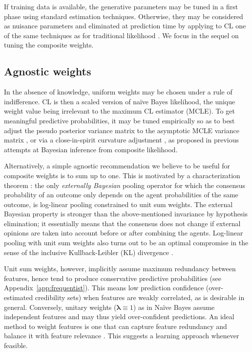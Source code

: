 \documentclass[english]{scrartcl}
\newcommand{\blambda}{{\boldsymbol{\lambda}}}
\begin{document}
If training data is available, the generative parameters may be tuned in a first phase using standard estimation techniques. Otherwise, they may be considered as nuisance parameters and eliminated at prediction time by applying to CL one of the same techniques as for traditional likelihood \cite{Berger-99}. We focus in the sequel on tuning the composite weights.


\subsection{Agnostic weights}

In the absence of knowledge, uniform weights may be chosen under a rule of indifference. CL is then a scaled version of na\"ive Bayes likelihood, the unique weight value being irrelevant to the maximum CL estimator (MCLE). To get meaningful predictive probabilities, it may be tuned empirically so as to best adjust the pseudo posterior variance matrix to the asymptotic MCLE variance matrix \cite{Pauli-11}, or via a close-in-spirit curvature adjustment \cite{Ribatet-12}, as proposed in previous attempts at Bayesian inference from composite likelihood. 

Alternatively, a simple agnostic recommendation we believe to be useful for composite weights is to sum up to one. This is motivated by a characterization theorem \cite{Genest-86,Genest-86b}: the only {\em externally Bayesian} pooling operator for which the consensus probability of an outcome only depends on the agent probabilities of the same outcome, is log-linear pooling constrained to unit sum weights. The external Bayesian property is stronger than the above-mentioned invariance by hypothesis elimination; it essentially means that the consensus does not change if external opinions are taken into account before or after combining the agents. Log-linear pooling with unit sum weights also turns out to be an  optimal compromise in the sense of the inclusive Kullback-Leibler (KL) divergence \cite{Garg-04}.

Unit sum weights, however, implicitly assume maximum redundancy between features, hence tend to produce conservative predictive probabilities (see Appendix~\ref{app:frequentist}). This means low prediction confidence (over-estimated credibility sets) when features are weakly correlated, as is desirable in general. Conversely, unitary weights ($\blambda\equiv 1$) as in Na\"ive Bayes assume independent features and may thus yield over-confident predictions. An ideal method to weight features is one that can capture feature redundancy and balance it with feature relevance \cite{Peng-05}. This suggests a learning approach whenever feasible.
\end{document}
